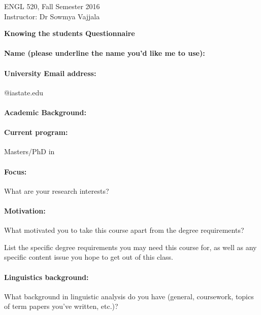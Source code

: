 \documentclass{article}
\begin{document}
ENGL 520, Fall Semester 2016 \\ Instructor: Dr Sowmya Vajjala

\bigskip
  \mbox{}\hfill \textbf{Knowing the students Questionnaire} \hfill \mbox{}

\smallskip

\doublespacing
\paragraph{Name \textmd{(please underline the name you'd like me to use)}:}

\singlespacing 

\paragraph{University Email address:} \underline{\hspace{3cm}} @iastate.edu


\paragraph{Academic Background:}


\paragraph{Current program:} Masters/PhD in \underline{\hspace{3cm}}


\paragraph{Focus:} What are your research interests?


\vspace{1.5cm}


\paragraph{Motivation:}

What motivated you to take this course apart from the degree requirements? 
\vfill\vfill

List the specific degree requirements you may need this course for, as well as any specific
content issue you hope to get out of this class.

\vfill\vfill


\paragraph{Linguistics background:}
What background in linguistic analysis do you have (general,
coursework, topics of term papers you've written, etc.)?  
\end{document}
